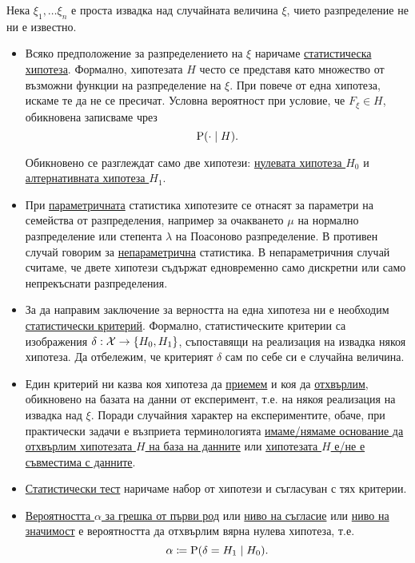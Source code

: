 \documentclass[numbers=endperiod, DIV=15, bibliography=totocnumbered]{scrartcl}
\begin{document}
\begin{definition}[Хипотези]
  Нека $\xi_1, \ldots \xi_n$ е проста извадка над случайната величина $\xi$, чието разпределение не ни е известно.

  \begin{itemize}
    \item Всяко предположение за разпределението на $\xi$ наричаме \uline{статистическа хипотеза}. Формално, хипотезата $H$ често се представя като множество от възможни функции на разпределение на $\xi$. При повече от една хипотеза, искаме те да не се пресичат. Условна вероятност при условие, че $F_\xi \in H$, обикновена записваме чрез
    \begin{displaymath}
      \operatorname{P}(\cdot \mid H).
    \end{displaymath}

    Обикновено се разглеждат само две хипотези: \uline{нулевата хипотеза $H_0$} и \uline{алтернативната хипотеза $H_1$}.

    \item При \uline{параметричната} статистика хипотезите се отнасят за параметри на семейства от разпределения, например за очакването $\mu$ на нормално разпределение или степента $\lambda$ на Поасоново разпределение. В противен случай говорим за \uline{непараметрична} статистика. В непараметричния случай считаме, че двете хипотези съдържат едновременно само дискретни или само непрекъснати разпределения.

    \item За да направим заключение за верността на една хипотеза ни е необходим \uline{статистически критерий}. Формално, статистическите критерии са изображения $\delta: \mathcal{X} \to \{ H_0, H_1 \}$, съпоставящи на реализация на извадка някоя хипотеза. Да отбележим, че критерият $\delta$ сам по себе си е случайна величина.

    \item Един критерий ни казва коя хипотеза да \uline{приемем} и коя да \uline{отхвърлим}, обикновено на базата на данни от експеримент, т.е. на някоя реализация на извадка над $\xi$. Поради случайния характер на експериментите, обаче, при практически задачи е възприета терминологията \uline{имаме/нямаме основание да отхвърлим хипотезата $H$ на база на данните} или \uline{хипотезата $H$ е/не е съвместима с данните}.

    \item \uline{Статистически тест} наричаме набор от хипотези и съгласуван с тях критерии.

    \item \uline{Вероятността $\alpha$ за грешка от първи род} или \uline{ниво на съгласие} или \uline{ниво на значимост} е вероятността да отхвърлим вярна нулева хипотеза, т.е.
    \begin{displaymath}
      \alpha \coloneqq \operatorname{P}(\delta = H_1 \mid H_0).
    \end{displaymath}


\end{itemize}
\end{definition}
\end{document}
